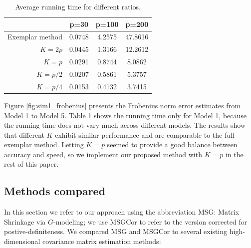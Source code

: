 \begin{table}
\centering
\setlength{\tabcolsep}{3pt} %
\begin{tabular}{rccc}
\hline
            & p=30 & p=100 & p=200 \\
\hline
Exemplar method   & 0.0748          & 4.2575         & 47.8616       \\
$K=2p$	      & 0.0445 	     & 1.3166	   & 12.2612         \\
$K=p$            & 0.0291         & 0.8744         & 8.0862         \\
$K=p/2$         & 0.0207         & 0.5861         & 5.3757         \\
$K=p/4$      & 0.0153         &0.4132          & 3.7415         \\
\hline
\end{tabular}
\caption{\label{tab:sim1_time} Average running time for different ratios.}
\end{table}

Figure \ref{fig:sim1_frobenius} presents the Frobenius norm error estimates from Model 1 to Model 5. Table \ref{tab:sim1_time} shows the running time only for Model 1, because the running time does not vary much across different models. The results show that different $K$ exhibit similar performance and are comparable to the full exemplar method. Letting $K = p$ seemed to provide a good balance between accuracy and speed, so we implement our proposed method with $K = p$ in the rest of this paper.

\subsection{\label{compared}Methods compared}

In this section we refer to our approach using the abbreviation MSG: Matrix Shrinkage via $G$-modeling; we use MSGCor to refer to the version corrected for postive-definiteness. We compared MSG and MSGCor to several existing high-dimensional covariance matrix estimation methods:

